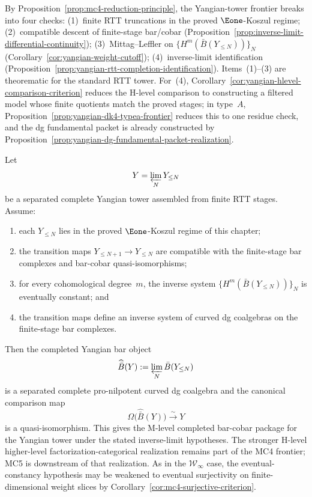 \begin{remark}
\label{rem:yangian-mc4-checklist}
By Proposition~\ref{prop:mc4-reduction-principle}, the Yangian-tower
frontier breaks into four checks:
\textup{(1)}~finite RTT truncations in the proved $\Eone$-Koszul regime;
\textup{(2)}~compatible descent of finite-stage bar/cobar
(Proposition~\ref{prop:inverse-limit-differential-continuity});
\textup{(3)}~Mittag--Leffler on
$\{H^m(\bar B(Y_{\le N}))\}_N$
(Corollary~\ref{cor:yangian-weight-cutoff});
\textup{(4)}~inverse-limit identification
(Proposition~\ref{prop:yangian-rtt-completion-identification}).
Items~\textup{(1)}--\textup{(3)} are theorematic for the standard RTT
tower.  For~\textup{(4)},
Corollary~\ref{cor:yangian-hlevel-comparison-criterion} reduces the
H-level comparison to constructing a filtered model whose finite
quotients match the proved stages; in type~$A$,
Proposition~\ref{prop:yangian-dk4-typea-frontier} reduces this to one
residue check, and the dg fundamental packet is already constructed by
Proposition~\ref{prop:yangian-dg-fundamental-packet-realization}.
\end{remark}

\begin{proposition}
\label{prop:yangian-tower-mc4-criterion}
Let
\[
Y = \varprojlim_N Y_{\le N}
\]
be a separated complete Yangian tower assembled from finite RTT stages.
Assume:
\begin{enumerate}
\item each $Y_{\le N}$ lies in the proved $\Eone$-Koszul regime of this
  chapter;
\item the transition maps $Y_{\le N+1} \to Y_{\le N}$ are compatible
  with the finite-stage bar complexes and bar-cobar
  quasi-isomorphisms;
\item for every cohomological degree~$m$, the inverse system
  $\{H^m(\bar B(Y_{\le N}))\}_N$ is eventually constant; and
\item the transition maps define an inverse system of curved dg
  coalgebras on the finite-stage bar complexes.
\end{enumerate}
Then the completed Yangian bar object
\[
\widehat{\bar B}(Y) := \varprojlim_N \bar B(Y_{\le N})
\]
is a separated complete pro-nilpotent curved dg coalgebra and the
canonical comparison map
\[
\Omega\bigl(\widehat{\bar B}(Y)\bigr) \xrightarrow{\sim} Y
\]
is a quasi-isomorphism.  This gives the M-level completed bar-cobar
package for the Yangian tower under the stated inverse-limit
hypotheses.  The stronger H-level
higher-level factorization-categorical realization remains part of the
MC4 frontier; MC5 is downstream of that realization.  As in the \(\mathcal{W}_\infty\) case, the eventual-constancy
hypothesis may be weakened to eventual surjectivity on finite-dimensional
weight slices by Corollary~\ref{cor:mc4-surjective-criterion}.
\end{proposition}

